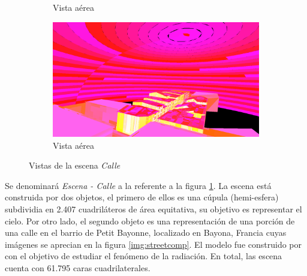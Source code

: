 \begin{figure}[H]
\begin{subfigure}{0.45\textwidth}
		\caption{Vista aérea}
	\end{subfigure}
	\begin{subfigure}{0.45\textwidth}
		\includegraphics[width=1\linewidth]{assets/street4}
		\caption{Vista aérea}
	\end{subfigure}
	\caption{Vistas de la escena \textit{Calle}}
	\label{img:street}
\end{figure}

Se denominará \textit{Escena - Calle} a la referente a la figura \ref{img:street}. La escena está construida por dos objetos, el primero de ellos es una cúpula (hemi-esfera) subdividia en 2.407 cuadriláteros de área equitativa, su objetivo es representar el cielo. Por otro lado, el segundo objeto es una representación de una porción de una calle en el barrio de Petit Bayonne, localizado en Bayona, Francia cuyas imágenes se aprecian en la figura \ref{img:streetcomp}. El modelo fue construido por \citeauthor{Benoit} con el objetivo de estudiar el fenómeno de la radiación. En total, las escena cuenta con 61.795 caras cuadrilaterales.


